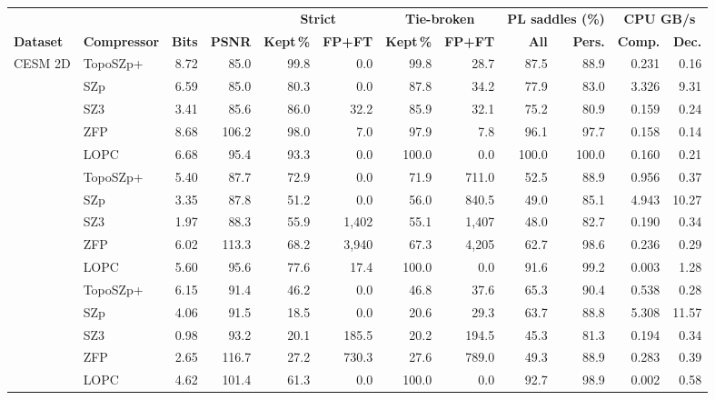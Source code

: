 \begin{tabular}{@{}llrrrrrrrrrr@{}}
\toprule
 & & & & \multicolumn{2}{c}{\textbf{Strict}} & \multicolumn{2}{c}{\textbf{Tie-broken}} & \multicolumn{2}{c}{\textbf{PL saddles (\%)}} & \multicolumn{2}{c}{\textbf{CPU GB/s}} \\
\cmidrule(lr){5-6}\cmidrule(lr){7-8}\cmidrule(lr){9-10}\cmidrule(lr){11-12}
\textbf{Dataset} & \textbf{Compressor} & \textbf{Bits} & \textbf{PSNR} & \textbf{Kept\,\%} & \textbf{FP+FT} & \textbf{Kept\,\%} & \textbf{FP+FT} & \textbf{All} & \textbf{Pers.} & \textbf{Comp.} & \textbf{Dec.} \\
\midrule
\multirow{5}{*}{CESM 2D} & TopoSZp+ & 8.72 & 85.0 & 99.8 & 0.0 & 99.8 & 28.7 & 87.5 & 88.9 & 0.231 & 0.16 \\
 & SZp & 6.59 & 85.0 & 80.3 & 0.0 & 87.8 & 34.2 & 77.9 & 83.0 & 3.326 & 9.31 \\
 & SZ3 & 3.41 & 85.6 & 86.0 & 32.2 & 85.9 & 32.1 & 75.2 & 80.9 & 0.159 & 0.24 \\
 & ZFP & 8.68 & 106.2 & 98.0 & 7.0 & 97.9 & 7.8 & 96.1 & 97.7 & 0.158 & 0.14 \\
 & LOPC & 6.68 & 95.4 & 93.3 & 0.0 & 100.0 & 0.0 & 100.0 & 100.0 & 0.160 & 0.21 \\
\addlinespace[2pt]
\multirow{5}{*}{CESM 3D} & TopoSZp+ & 5.40 & 87.7 & 72.9 & 0.0 & 71.9 & 711.0 & 52.5 & 88.9 & 0.956 & 0.37 \\
 & SZp & 3.35 & 87.8 & 51.2 & 0.0 & 56.0 & 840.5 & 49.0 & 85.1 & 4.943 & 10.27 \\
 & SZ3 & 1.97 & 88.3 & 55.9 & 1{,}402 & 55.1 & 1{,}407 & 48.0 & 82.7 & 0.190 & 0.34 \\
 & ZFP & 6.02 & 113.3 & 68.2 & 3{,}940 & 67.3 & 4{,}205 & 62.7 & 98.6 & 0.236 & 0.29 \\
 & LOPC & 5.60 & 95.6 & 77.6 & 17.4 & 100.0 & 0.0 & 91.6 & 99.2 & 0.003 & 1.28 \\
\addlinespace[2pt]
\multirow{5}{*}{Hurricane} & TopoSZp+ & 6.15 & 91.4 & 46.2 & 0.0 & 46.8 & 37.6 & 65.3 & 90.4 & 0.538 & 0.28 \\
 & SZp & 4.06 & 91.5 & 18.5 & 0.0 & 20.6 & 29.3 & 63.7 & 88.8 & 5.308 & 11.57 \\
 & SZ3 & 0.98 & 93.2 & 20.1 & 185.5 & 20.2 & 194.5 & 45.3 & 81.3 & 0.194 & 0.34 \\
 & ZFP & 2.65 & 116.7 & 27.2 & 730.3 & 27.6 & 789.0 & 49.3 & 88.9 & 0.283 & 0.39 \\
 & LOPC & 4.62 & 101.4 & 61.3 & 0.0 & 100.0 & 0.0 & 92.7 & 98.9 & 0.002 & 0.58 \\

\end{tabular}
